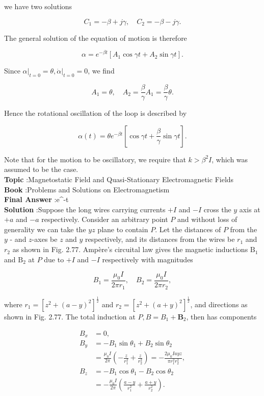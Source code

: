\documentclass[10pt]{article}
\begin{document}
we have two solutions

$$
C_{1}=-\beta+j \gamma, \quad C_{2}=-\beta-j \gamma .
$$

The general solution of the equation of motion is therefore

$$
\alpha=e^{-\beta t}\left[A_{1} \cos \gamma t+A_{2} \sin \gamma t\right] .
$$

Since $\left.\alpha\right|_{t=0}=\theta,\left.\dot{\alpha}\right|_{t=0}=0$, we find

$$
A_{1}=\theta, \quad A_{2}=\frac{\beta}{\gamma} A_{1}=\frac{\beta}{\gamma} \theta .
$$

Hence the rotational oscillation of the loop is described by

$$
\alpha(t)=\theta e^{-\beta t}\left[\cos \gamma t+\frac{\beta}{\gamma} \sin \gamma t\right] .
$$

Note that for the motion to be oscillatory, we require that $k>\beta^{2} I$, which was assumed to be the case.
\\
\textbf{Topic} :Magnetostatic Field and Quasi-Stationary Electromagnetic Fields\\
\textbf{Book} :Problems and Solutions on Electromagnetism\\
\textbf{Final Answer} :\theta e^{-\beta t}\\


\textbf{Solution} :Suppose the long wires carrying currents $+I$ and $-I$ cross the $y$ axis at $+a$ and $-a$ respectively. Consider an arbitrary point $P$ and without loss of generality we can take the $y z$ plane to contain $P$. Let the distances of $P$ from the $y$ - and $z$-axes be $z$ and $y$ respectively, and its distances from the wires be $r_{1}$ and $r_{2}$ as shown in Fig. 2.77. Ampère's circuital law gives the magnetic inductions $\mathrm{B}_{1}$ and $\mathrm{B}_{2}$ at $P$ due to $+I$ and $-I$ respectively with magnitudes

$$
B_{1}=\frac{\mu_{0} I}{2 \pi r_{1}}, \quad B_{2}=\frac{\mu_{0} I}{2 \pi r_{2}},
$$

where $r_{1}=\left[z^{2}+(a-y)^{2}\right]^{\frac{1}{2}}$ and $r_{2}=\left[z^{2}+(a+y)^{2}\right]^{\frac{1}{2}}$, and directions as shown in Fig. 2.77. The total induction at $P, B=B_{1}+\mathbf{B}_{2}$, then has components

$$
\begin{aligned}
B_{x} &=0, \\
B_{y} &=-B_{1} \sin \theta_{1}+B_{2} \sin \theta_{2} \\
&=\frac{\mu_{0} I}{2 \pi}\left(-\frac{z}{r_{1}^{2}}+\frac{z}{r_{2}^{2}}\right)=-\frac{2 \mu_{0} I a y z}{\pi r_{1}^{2} r_{2}^{2}}, \\
B_{z} &=-B_{1} \cos \theta_{1}-B_{2} \cos \theta_{2} \\
&=-\frac{\mu_{0} I}{2 \pi}\left(\frac{a-y}{r_{1}^{2}}+\frac{a+y}{r_{2}^{2}}\right) .
\end{aligned}
$$
\end{document}
